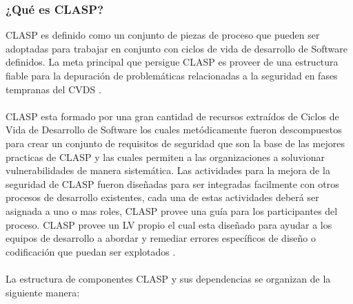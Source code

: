 \documentclass[runningheads,a4paper]{llncs}
\begin{document}
\subsubsection{¿Qué es \gls{CLASP}?}
\gls{CLASP} es definido como un conjunto de piezas de proceso que pueden ser adoptadas para trabajar en conjunto con ciclos de vida de desarrollo de \gls{Software} definidos. La meta principal que persigue \gls{CLASP} es proveer de una estructura fiable para la depuración de problemáticas relacionadas a la seguridad en fases tempranas del \gls{CVDS} \cite{CLASPIntroduction}. 
\\\\
\gls{CLASP} esta formado por una gran cantidad de recursos extraídos de Ciclos de Vida de Desarrollo de \gls{Software} los cuales metódicamente fueron descompuestos para crear un conjunto de requisitos de seguridad que son la base de las mejores practicas de \gls{CLASP} y las cuales permiten a las organizaciones a soluvionar vulnerabilidades de manera sistemática. Las actividades para la mejora de la seguridad de \gls{CLASP} fueron diseñadas para ser integradas facilmente con otros procesos de desarrollo existentes, cada una de estas actividades deberá ser asignada a uno o mas roles, \gls{CLASP} provee una guía para los participantes del proceso. \gls{CLASP} provee un \gls{LV} propio el cual esta diseñado para ayudar a los equipos de desarrollo a abordar y remediar errores específicos de diseño o codificación que puedan ser explotados \cite{CLASPConcepts}.  
\\\\
La estructura de componentes \gls{CLASP} y sus dependencias se organizan de la siguiente manera:
\end{document}

